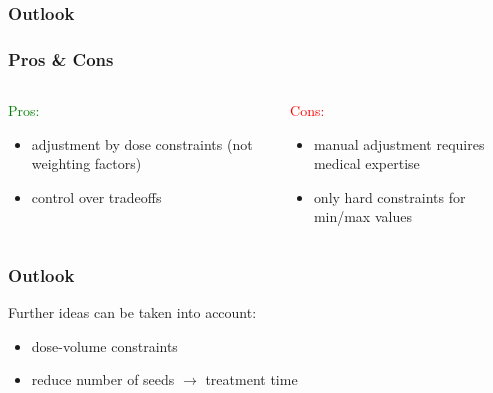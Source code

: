 \documentclass{beamer}
\begin{document}
	\subsubsection{Outlook}
	\begin{frame}
		\frametitle{Pros \& Cons}
		
		\begin{columns}[T] %
		\begin{column}{.48\textwidth}
		\textcolor{green}{Pros:}
		\begin{itemize}
		\item adjustment by dose constraints (not weighting factors)
		\item control over tradeoffs
		\end{itemize}
		
		\end{column}%
		\hfill%
		\begin{column}{.48\textwidth}
		\textcolor{red}{Cons:}
		
		\begin{itemize}
		\item manual adjustment requires medical expertise
		\item only hard constraints for min/max values
		\end{itemize}
		\end{column}%
		\end{columns}
	\end{frame}
	
	\begin{frame}
	\frametitle{Outlook}
		Further ideas can be taken into account:
		\begin{itemize}
			\item dose-volume constraints
			\item reduce number of seeds $\rightarrow$ treatment time
		\end{itemize}  
	\end{frame}
	
\end{document}
